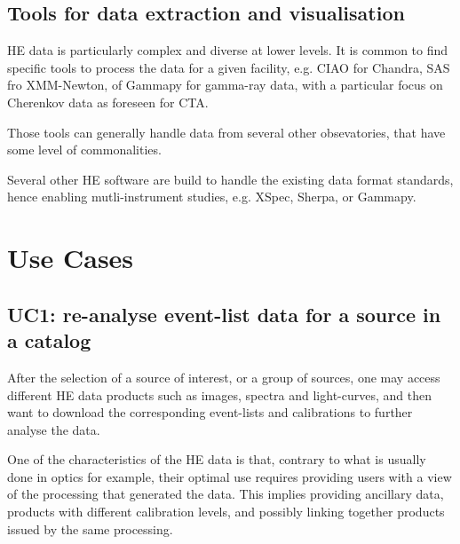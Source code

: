 \documentclass[11pt,a4paper]{ivoa}
\begin{document}


\subsection{Tools for data extraction and visualisation}
\label{sec:tools}

HE data is particularly complex and diverse at lower levels. It is common to find specific tools to process the data for a given facility, e.g. CIAO for Chandra, SAS fro XMM-Newton, of Gammapy for gamma-ray data, with a particular focus on Cherenkov data as foreseen for CTA.

Those tools can generally handle data from several other obsevatories, that have some level of commonalities.

Several other HE software are build to handle the existing data format standards, hence enabling mutli-instrument studies, e.g. XSpec, Sherpa, or Gammapy.





\section{Use Cases}

\subsection{UC1: re-analyse event-list data for a source in a catalog}

After the selection of a source of interest, or a group of sources, one may access different HE data products such as images, spectra and light-curves, and then want to download the corresponding event-lists and calibrations to further analyse the data.

One of the characteristics of the HE data is that, contrary to what is usually done in optics for example, their optimal use requires providing users with a view of the processing that generated the data. This implies providing ancillary data, products with different calibration levels, and possibly linking together products issued by the same processing.
\end{document}
